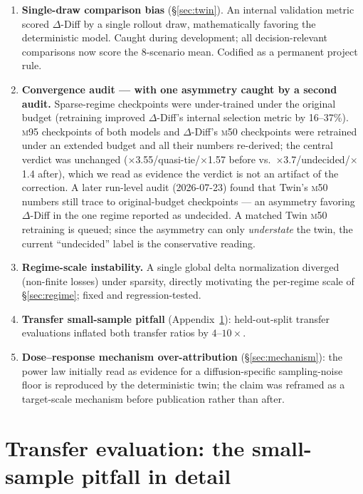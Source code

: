\documentclass[11pt]{article}
\newcommand{\ours}{\mbox{$\Delta$-Diff}}
\newcommand{\twin}{\mbox{Twin}}
\newcommand{\mfifty}{\textsc{m50}}
\newcommand{\mninetyfive}{\textsc{m95}}
\begin{document}
\begin{enumerate}
  \item \textbf{Single-draw comparison bias} (\S\ref{sec:twin}). An
    internal validation metric scored \ours{} by a single rollout draw,
    mathematically favoring the deterministic model. Caught during
    development; all decision-relevant comparisons now score the
    8-scenario mean. Codified as a permanent project rule.
  \item \textbf{Convergence audit --- with one asymmetry caught by a
    second audit.} Sparse-regime checkpoints were under-trained under the
    original budget (retraining improved \ours{}'s internal selection
    metric by 16--37\%). \mninetyfive{} checkpoints of both models and
    \ours{}'s \mfifty{} checkpoints were retrained under an extended
    budget and all their numbers re-derived; the central verdict was
    unchanged ($\times$3.55/quasi-tie/$\times$1.57 before vs.\
    $\times$3.7/undecided/$\times$1.4 after), which we read as evidence
    the verdict is not an artifact of the correction. A later run-level
    audit (2026-07-23) found that \twin{}'s \mfifty{} numbers still trace
    to original-budget checkpoints --- an asymmetry favoring \ours{} in
    the one regime reported as undecided. A matched \twin{} \mfifty{}
    retraining is queued; since the asymmetry can only \emph{understate}
    the twin, the current ``undecided'' label is the conservative
    reading.
  \item \textbf{Regime-scale instability.} A single global delta
    normalization diverged (non-finite losses) under sparsity, directly
    motivating the per-regime scale of \S\ref{sec:regime}; fixed and
    regression-tested.
  \item \textbf{Transfer small-sample pitfall}
    (Appendix~\ref{app:transferpitfall}): held-out-split transfer
    evaluations inflated both transfer ratios by $4$--$10\times$.
  \item \textbf{Dose--response mechanism over-attribution}
    (\S\ref{sec:mechanism}): the power law initially read as evidence
    for a diffusion-specific sampling-noise floor is reproduced by the
    deterministic twin; the claim was reframed as a target-scale
    mechanism before publication rather than after.
\end{enumerate}

\section{Transfer evaluation: the small-sample pitfall in detail}
\label{app:transferpitfall}
\end{document}
